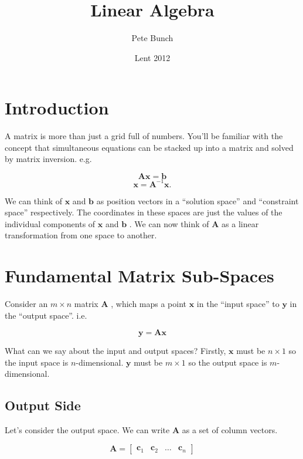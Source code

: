 \documentclass[a4paper,10pt]{article}
\title{Linear Algebra}
\author{Pete Bunch}
\date{Lent 2012}
\newcommand{\mA}{$\mathbf{A}$ }
\newcommand{\vb}{$\mathbf{b}$ }
\newcommand{\vx}{$\mathbf{x}$ }
\newcommand{\vy}{$\mathbf{y}$ }
\begin{document}
\maketitle

\section{Introduction}

A matrix is more than just a grid full of numbers. You'll be familiar with the concept that simultaneous equations can be stacked up into a matrix and solved by matrix inversion. e.g.

\begin{equation}
 \mathbf{A x} = \mathbf{b}
\end{equation}
\begin{equation}
 \mathbf{x} = \mathbf{A}^{-1} \mathbf{x}  .
\end{equation}

We can think of \vx and \vb as position vectors in a ``solution space'' and ``constraint space'' respectively. The coordinates in these spaces are just the values of the individual components of \vx and \vb. We can now think of \mA as a linear transformation from one space to another.



\section{Fundamental Matrix Sub-Spaces}

Consider an $m \times n$ matrix \mA, which maps a point \vx in the ``input space'' to \vy in the ``output space''. i.e.

\begin{equation}
 \mathbf{y} = \mathbf{A x}
\end{equation}

What can we say about the input and output spaces? Firstly, \vx must be $n \times 1$ so the input space is $n$-dimensional. \vy must be $m \times 1$ so the output space is $m$-dimensional.

\subsection{Output Side}

Let's consider the output space. We can write \mA as a set of column vectors.

\begin{equation}
 \mathbf{A} = \begin{bmatrix}\mathbf{c}_1 & \mathbf{c}_2 & \dots & \mathbf{c}_n \end{bmatrix}
\end{equation}
\end{document}
